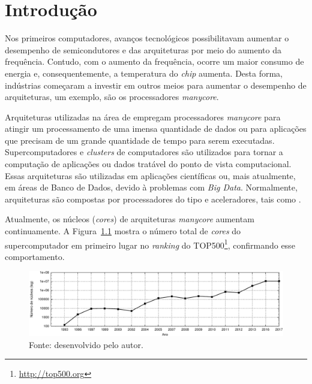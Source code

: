 \chapter{Introdução}
\label{cha:introducao}

Nos primeiros computadores, avanços tecnológicos possibilitavam aumentar o
desempenho de semicondutores e das arquiteturas por meio do aumento da
frequência. Contudo, com o aumento da frequência, ocorre um maior consumo de
energia e, consequentemente, a temperatura do \textit{chip} aumenta. Desta
forma, indústrias começaram a investir em outros meios para aumentar o
desempenho de arquiteturas, um exemplo, são os processadores \textit{manycore}.

Arquiteturas utilizadas na área de \hpc empregam processadores \textit{manycore} para atingir um
processamento de uma imensa quantidade de dados ou para aplicações que precisam
de um grande quantidade de tempo para serem executadas. Supercomputadores e
\textit{clusters} de computadores são utilizados para tornar a computação de
aplicações ou dados tratável do ponto de vista computacional. Essas arquiteturas
são utilizadas em aplicações científicas ou, mais atualmente, em áreas de Banco
de Dados, devido à problemas com \textit{Big Data}. Normalmente, arquiteturas
\hpc são compostas por processadores do tipo \cpu{} e aceleradores, tais como \gpu.

Atualmente, os núcleos (\textit{cores}) de arquiteturas \textit{manycore}
aumentam continuamente. A Figura~\ref{fig:graphCores} mostra o número total de
\textit{cores} do supercomputador em primeiro lugar no \textit{ranking} do
TOP500\footnote{\url{http://top500.org}}, confirmando esse comportamento.


\begin{figure}[b]
	\centering
	\caption{Crescimento do número de núcleos do supercomputadores número 1 do \textit{ranking} Top500 (dados extraídos do Top500).}
	\includegraphics[width=\textwidth]{figs/top500.pdf}
    \caption*{Fonte: desenvolvido pelo autor.}
	\label{fig:graphCores}
\end{figure}

